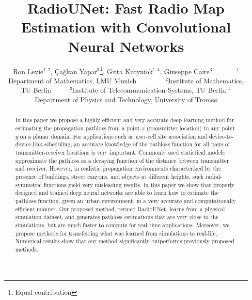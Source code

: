 \documentclass[10pt,a4paper]{article}
\begin{document}
%
\title{RadioUNet: Fast Radio Map Estimation with Convolutional Neural Networks}



\author{\begin{center} Ron Levie$^{1,2}$, \c{C}a\u{g}kan Yapar$^3$\footnote{Equal contribution}, Gitta Kutyniok$^{1,4}$, Giuseppe Caire$^3$  \newline
\textcolor{white}{BLAN}
$^1$Department of Mathematics, LMU Munich \newline
\textcolor{white}{BLANK}
$^2$Institute of Mathematics, TU Berlin \newline
\textcolor{white}{BLA}
$^3$Institute of Telecommunication Systems, TU Berlin  \newline
$^4$Department of Physics and Technology, University of Troms{\o} \vspace{-4mm}
\end{center}}



\maketitle

\begin{abstract}
In this paper we propose a highly efficient and very accurate deep learning method for estimating the propagation pathloss from a point $x$ (transmitter location) to any point $y$ on a planar domain. For applications such as user-cell site association and device-to-device link scheduling, an accurate knowledge of the pathloss function for all pairs of transmitter-receiver locations is very important. Commonly used statistical models approximate the pathloss as a decaying function of the distance between transmitter and receiver.  However, in realistic propagation environments characterized by the presence of buildings, street canyons, and objects at different heights, such radial-symmetric functions yield very misleading results. In this paper we show that properly designed and trained deep neural networks are able to learn how to estimate the pathloss function, given an urban environment, in a very accurate and computationally efficient manner. Our proposed method, termed RadioUNet, learns from a physical simulation dataset, and generates pathloss estimations that are very close to the simulations, but are much faster to compute for real-time applications. Moreover, we propose methods for transferring what was learned from simulations to real-life. Numerical results show that our method significantly outperforms  previously proposed methods. 
\end{abstract}
\end{document}
